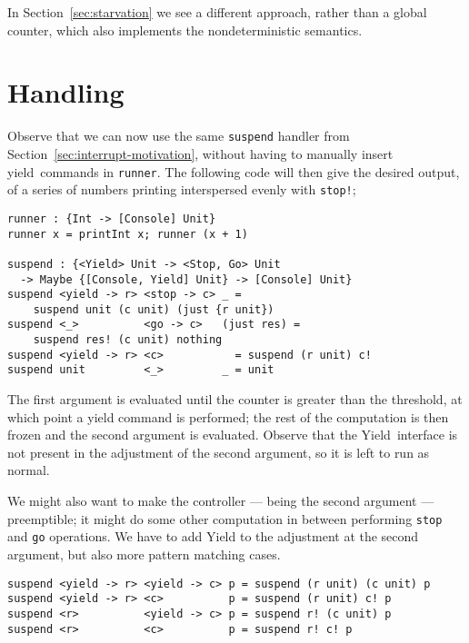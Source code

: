\documentclass[msc,deptreport,cs]{infthesis} %
\newcommand{\code}[1]{\lstinline{#1}}
\newcommand\yield{\textsf{yield}\xspace}
\newcommand\Yield{\textsf{Yield}\xspace}
\begin{document}

In Section~\ref{sec:starvation} we see a different approach, rather than a
global counter, which also implements the nondeterministic semantics.

\section{Handling}
\label{sec:handling}

Observe that we can now use the same \code{suspend} handler from
Section~\ref{sec:interrupt-motivation}, without having to manually insert
\yield~commands in \code{runner}. The following code will then give the desired
output, of a series of numbers printing interspersed evenly with \code{stop!};

\begin{lstlisting}
runner : {Int -> [Console] Unit}
runner x = printInt x; runner (x + 1)

suspend : {<Yield> Unit -> <Stop, Go> Unit
  -> Maybe {[Console, Yield] Unit} -> [Console] Unit}
suspend <yield -> r> <stop -> c> _ =
    suspend unit (c unit) (just {r unit})
suspend <_>          <go -> c>   (just res) =
    suspend res! (c unit) nothing
suspend <yield -> r> <c>           = suspend (r unit) c!
suspend unit         <_>         _ = unit
\end{lstlisting}

The first argument is evaluated until the counter is greater than the threshold,
at which point a yield command is performed; the rest of the computation is then
frozen and the second argument is evaluated. Observe that the \Yield~interface
is not present in the adjustment of the second argument, so it is left to run
as normal.

We might also want to make the controller --- being the second argument ---
preemptible; it might do some other computation in between performing
\code{stop} and \code{go} operations. We have to add \Yield to the adjustment at
the second argument, but also more pattern matching cases.

\begin{lstlisting}[]
suspend <yield -> r> <yield -> c> p = suspend (r unit) (c unit) p
suspend <yield -> r> <c>          p = suspend (r unit) c! p
suspend <r>          <yield -> c> p = suspend r! (c unit) p
suspend <r>          <c>          p = suspend r! c! p
\end{lstlisting}
%
\end{document}
